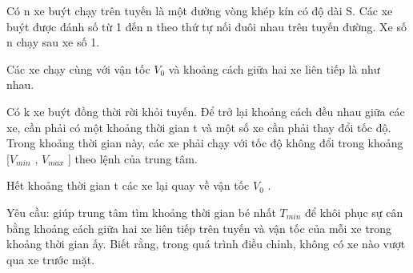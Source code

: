 Có n xe buýt chạy trên tuyến là một đường vòng khép kín có độ dài S. Các xe buýt được đánh số từ 1 đến n theo thứ tự nối đuôi nhau trên tuyến đường. Xe số n chạy sau xe số 1.  

   Các xe chạy cùng với vận tốc $V_{0}$   và khoảng cách giữa hai xe liên tiếp là như nhau.  

   Có k xe buýt đồng thời rời khỏi tuyến. Để trở lại khoảng cách đều nhau giữa các xe, cần phải có một khoảng thời gian t và một số xe cần phải thay   đổi tốc độ. Trong khoảng thời gian này, các xe phải chạy với tốc độ không đổi trong khoảng [$V_{min}$   , $V_{max}$   ] theo lệnh của   trung tâm.  

   Hết khoảng thời gian t các xe lại quay về vận tốc $V_{0}$   .  

   Yêu cầu: giúp trung tâm tìm khoảng thời gian bé nhất $T_{min}$   để khôi phục sự cân bằng khoảng cách giữa hai xe liên tiếp trên tuyến và   vận tốc của mỗi xe trong khoảng thời gian ấy. Biết rằng, trong quá trình điều chỉnh, không có xe nào vượt qua xe trước mặt.